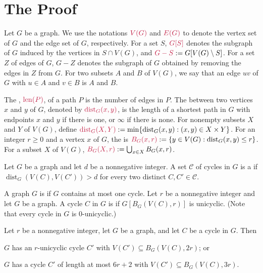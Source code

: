 \documentclass{patmorin}
\DeclareMathOperator{\len}{len}
\DeclareMathOperator{\dist}{dist}
\begin{document}
\section{The Proof}
\label{proof}

Let $G$ be a graph.  We use the notations $\mathdefin{V(G)}$ and $\mathdefin{E(G)}$ to denote the vertex set of $G$ and the edge set of $G$, respectively.  For a set $S$, $\mathdefin{G[S]}$ denotes the subgraph of $G$ induced by the vertices in $S\cap V(G)$, and $\mathdefin{G-S}:=G[V(G)\setminus S]$.  For a set $Z$ of edges of $G$, $G-Z$ denotes the subgraph of $G$ obtained by removing the edges in $Z$ from $G$.  For two subsets $A$ and $B$ of $V(G)$, we say that an edge $uv$ of $G$ with $u\in A$ and $v\in B$ is  $A$ and $B$.



The , $\mathdefin{\len(P)}$, of a path $P$ is the number of edges in $P$. The  between two vertices $x$ and $y$ of $G$, denoted by $\mathdefin{\dist_G(x,y)}$, is the length of a shortest path in $G$ with endpoints $x$ and $y$ if there is one, or $\infty$ if there is none. For nonempty subsets $X$ and $Y$ of $V(G)$, define $\mathdefin{\dist_G(X,Y)}:=\min\{\dist_G(x,y):(x,y)\in X\times Y\}$. For an integer $r\ge 0$ and a vertex $x$ of $G$, the  is $\mathdefin{B_G(x,r)}:=\{y\in V(G):\dist_G(x,y)\le r\}$.  For a subset $X$ of $V(G)$, $\mathdefin{B_G(X,r)}:=\bigcup_{x\in X}B_G(x,r)$.

Let $G$ be a graph and let $d$ be a nonnegative integer. A set $\mathcal{C}$ of cycles in $G$ is a  if $\dist_G(V(C),V(C'))> d$ for every two distinct $C,C'\in\mathcal{C}$.

A graph $G$ is  if $G$ contains at most one cycle.  Let $r$ be a nonnegative integer and let $G$ be a graph. A cycle $C$ in $G$ is  if $G[B_G(V(C),r)]$ is unicyclic. (Note that every cycle in $G$ is $0$-unicyclic.)

\begin{lem}\label{short_or_unicycle_nearby}
  Let $r$ be a nonnegative integer, let $G$ be a graph, and let $C$ be a cycle in $G$. Then
  \begin{tightenum}%
    \item $G$ has an $r$-unicyclic cycle $C'$ with $V(C')\subseteq B_G(V(C),2r)$; or\label{short_or_unicycle_nearby:unicyclic}
    \item $G$ has a cycle $C'$ of length at most $6r+2$ with $V(C')\subseteq B_G(V(C),3r)$.\label{short_or_unicycle_nearby:short}
  \end{tightenum}
\end{lem}
\end{document}

